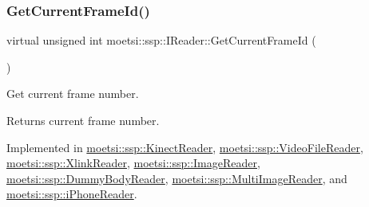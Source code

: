 \mbox{\label{classmoetsi_1_1ssp_1_1IReader_ac292d83eb06dee277baaa06e281a562d}} 
\subsubsection{\texorpdfstring{Get\+Current\+Frame\+Id()}{GetCurrentFrameId()}\hspace{0.1cm}{\footnotesize\ttfamily [2/2]}}
{\footnotesize\ttfamily virtual unsigned int moetsi\+::ssp\+::\+I\+Reader\+::\+Get\+Current\+Frame\+Id (\begin{DoxyParamCaption}{ }\end{DoxyParamCaption})\hspace{0.3cm}{\ttfamily [pure virtual]}}



Get current frame number. 

\begin{DoxyReturn}{Returns}
current frame number. 
\end{DoxyReturn}


Implemented in \hyperlink{classmoetsi_1_1ssp_1_1KinectReader_aa17e268723c41bdad5082575decb28eb}{moetsi\+::ssp\+::\+Kinect\+Reader}, \hyperlink{classmoetsi_1_1ssp_1_1VideoFileReader_aef5c92da2645cddc7e4ffcfd34ad4b8a}{moetsi\+::ssp\+::\+Video\+File\+Reader}, \hyperlink{classmoetsi_1_1ssp_1_1XlinkReader_ae11a3b07f2f036f87bc3d96685f61dae}{moetsi\+::ssp\+::\+Xlink\+Reader}, \hyperlink{classmoetsi_1_1ssp_1_1ImageReader_a386125736df9f25e5c4312bb679ff031}{moetsi\+::ssp\+::\+Image\+Reader}, \hyperlink{classmoetsi_1_1ssp_1_1DummyBodyReader_a91d5b81c241103ffde276d354a34d7db}{moetsi\+::ssp\+::\+Dummy\+Body\+Reader}, \hyperlink{classmoetsi_1_1ssp_1_1MultiImageReader_a994eea20e9682c2f4afc9303a34c76f3}{moetsi\+::ssp\+::\+Multi\+Image\+Reader}, and \hyperlink{classmoetsi_1_1ssp_1_1iPhoneReader_a78792c6319743aed3ef2afc96fe16485}{moetsi\+::ssp\+::i\+Phone\+Reader}.

\mbox{\label{classmoetsi_1_1ssp_1_1IReader_a9f6a8650ca290b011b8e5451eeae9f32}} 
